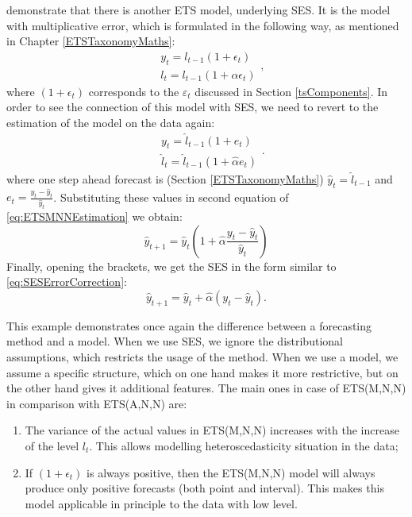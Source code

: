 \documentclass[
]{book}
\providecommand{\tightlist}{%
  \setlength{\itemsep}{0pt}\setlength{\parskip}{0pt}}
\theoremstyle{definition}
\theoremstyle{definition}
\theoremstyle{definition}
\theoremstyle{definition}
\theoremstyle{remark}
\begin{document}
\citet{Hyndman2008b} demonstrate that there is another ETS model, underlying SES. It is the model with multiplicative error, which is formulated in the following way, as mentioned in Chapter \ref{ETSTaxonomyMaths}:
\begin{equation}
  \begin{aligned}
    & y_{t} = l_{t-1}(1 + \epsilon_t) \\
    & l_t = l_{t-1}(1 + \alpha \epsilon_t)
  \end{aligned} ,
  \label{eq:ETSMNN}
\end{equation}
where \((1+\epsilon_t)\) corresponds to the \(\varepsilon_t\) discussed in Section \ref{tsComponents}. In order to see the connection of this model with SES, we need to revert to the estimation of the model on the data again:
\begin{equation}
  \begin{aligned}
    & y_{t} = \hat{l}_{t-1}(1 + e_t) \\
    & \hat{l}_t = \hat{l}_{t-1}(1 + \hat{\alpha} e_t)
  \end{aligned} .
  \label{eq:ETSMNNEstimation}
\end{equation}
where one step ahead forecast is (Section \ref{ETSTaxonomyMaths}) \(\hat{y}_t = \hat{l}_{t-1}\) and \(e_t=\frac{y_t - \hat{y}_t}{\hat{y}_t}\). Substituting these values in second equation of \eqref{eq:ETSMNNEstimation} we obtain:
\begin{equation}
    \hat{y}_{t+1} = \hat{y}_t \left(1 + \hat{\alpha} \frac{y_t - \hat{y}_t}{\hat{y}_t} \right)
  \label{eq:ETSMNNEstimation2}
\end{equation}
Finally, opening the brackets, we get the SES in the form similar to \eqref{eq:SESErrorCorrection}:
\begin{equation}
    \hat{y}_{t+1} = \hat{y}_t + \hat{\alpha} (y_t - \hat{y}_t).
  \label{eq:ETSMNNEstimation4}
\end{equation}

This example demonstrates once again the difference between a forecasting method and a model. When we use SES, we ignore the distributional assumptions, which restricts the usage of the method. When we use a model, we assume a specific structure, which on one hand makes it more restrictive, but on the other hand gives it additional features. The main ones in case of ETS(M,N,N) in comparison with ETS(A,N,N) are:

\begin{enumerate}
\def\labelenumi{\arabic{enumi}.}
\tightlist
\item
  The variance of the actual values in ETS(M,N,N) increases with the increase of the level \(l_{t}\). This allows modelling heteroscedasticity situation in the data;
\item
  If \((1+\epsilon_t)\) is always positive, then the ETS(M,N,N) model will always produce only positive forecasts (both point and interval). This makes this model applicable in principle to the data with low level.
\end{enumerate}
\end{document}
